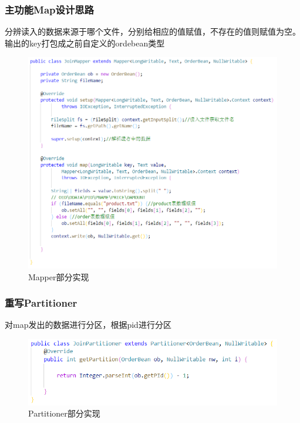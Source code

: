 \documentclass[a4paper,UTF8]{article}
\numberwithin{equation}{section}
\begin{document}
\subsubsection{主功能Map设计思路}
分辨读入的数据来源于哪个文件，分别给相应的值赋值，不存在的值则赋值为空。输出的key打包成之前自定义的ordebean类型
\begin{figure}[H]
    \centering

    \includegraphics[width = 15cm]{map1.png}

    \caption{Mapper部分实现}
    \label{mapper}
\end{figure}
\subsubsection{重写Partitioner}
对map发出的数据进行分区，根据pid进行分区
\begin{figure}[H]
    \centering

    \includegraphics[width = 15cm]{part1.png}

    \caption{Partitioner部分实现}
\end{figure}
\end{document}
